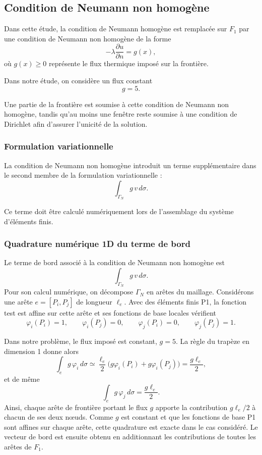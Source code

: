 \documentclass[12pt,a4paper]{article}
\begin{document}
	\subsection{Condition de Neumann non homogène}
	\label{sec:etape5}
	
	Dans cette étude, la condition de Neumann homogène est remplacée sur $F_1$
	par une condition de Neumann non homogène de la forme
	\[
	-\lambda \frac{\partial u}{\partial n}=g(x),
	\]
	où $g(x)\geq 0$ représente le flux thermique imposé sur la frontière.
	
	Dans notre étude, on considère un flux constant
	\[
	g=5.
	\]
	
	Une partie de la frontière est soumise à cette condition de Neumann
	non homogène, tandis qu'au moins une fenêtre reste soumise à une
	condition de Dirichlet afin d'assurer l'unicité de la solution.
	
	\subsubsection{Formulation variationnelle}
	
	La condition de Neumann non homogène introduit un terme supplémentaire
	dans le second membre de la formulation variationnelle :
	\[
	\int_{\Gamma_N} g\,v\,d\sigma.
	\]
	
	Ce terme doit être calculé numériquement lors de l'assemblage du système
	d'éléments finis.
	
	\subsubsection{Quadrature numérique 1D du terme de bord}
	\label{sec:quadrature-1d}
	
	
	Le terme de bord associé à la condition de Neumann non homogène est
	\[
	\int_{\Gamma_N} g\,v\,d\sigma.
	\]
	Pour son calcul numérique, on décompose $\Gamma_N$ en arêtes du maillage.
	Considérons une arête $e=[P_i,P_j]$ de longueur $\ell_e$. Avec des éléments
	finis P1, la fonction test est affine sur cette arête et ses fonctions de base
	locales vérifient
	\[
	\varphi_i(P_i)=1,\qquad \varphi_i(P_j)=0,\qquad
	\varphi_j(P_i)=0,\qquad \varphi_j(P_j)=1.
	\]
	
	Dans notre problème, le flux imposé est constant, $g=5$. La règle du trapèze
	en dimension 1 donne alors
	\[
	\int_e g\,\varphi_i\,d\sigma
	\simeq \frac{\ell_e}{2}\bigl(g\varphi_i(P_i)+g\varphi_i(P_j)\bigr)
	= \frac{g\ell_e}{2},
	\]
	et de même
	\[
	\int_e g\,\varphi_j\,d\sigma = \frac{g\ell_e}{2}.
	\]
	Ainsi, chaque arête de frontière portant le flux $g$ apporte la contribution
	$g\ell_e/2$ à chacun de ses deux nœuds. Comme $g$ est constant et que les
	fonctions de base P1 sont affines sur chaque arête, cette quadrature est exacte
	dans le cas considéré. Le vecteur de bord est ensuite obtenu en additionnant
	les contributions de toutes les arêtes de $F_1$.
	
\end{document}
